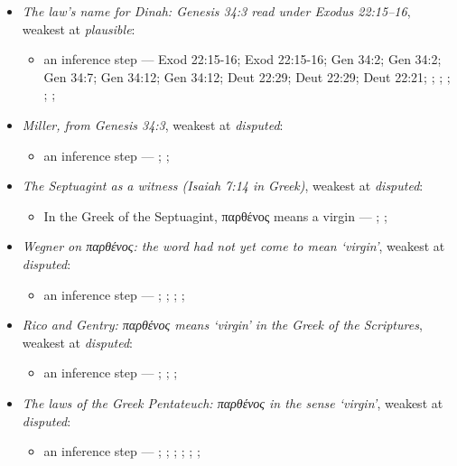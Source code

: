 \documentclass[11pt]{article}
\begin{document}
\begin{itemize}
\item \emph{The law’s name for Dinah: Genesis 34:3 read under Exodus 22:15–16}, weakest at \emph{plausible}:
\begin{itemize}
\item an inference step --- Exod 22:15-16; Exod 22:15-16; Gen 34:2; Gen 34:2; Gen 34:7; Gen 34:12; Gen 34:12; Deut 22:29; Deut 22:29; Deut 22:21; \cite[80, 91]{frymer-kensky-virginity-1998}; \cite[405--426]{enc-referential-analysis-1986}; \cite[18--21]{rico-gentry-infant-king-2020}; \cite[113]{bratcher-study-of-isaiah-1958}; \cite[483]{wegner-virgin-births-2011}; \cite[67]{rhodea-did-matthew-conceive-2013}
\end{itemize}
\item \emph{Miller, from Genesis 34:3}, weakest at \emph{disputed}:
\begin{itemize}
\item an inference step --- \cite{miller-born-divine-2003}; \cite[18--21]{rico-gentry-infant-king-2020}; \cite[113]{bratcher-study-of-isaiah-1958}
\end{itemize}
\item \emph{The Septuagint as a witness (Isaiah 7:14 in Greek)}, weakest at \emph{disputed}:
\begin{itemize}
\item In the Greek of the Septuagint, παρθένος means a virgin --- \cite[21]{rico-gentry-infant-king-2020}; \cite[113]{bratcher-study-of-isaiah-1958}; \cite[472]{postell-isaiah-messianic-2025}
\end{itemize}
\item \emph{Wegner on παρθένος: the word had not yet come to mean ‘virgin’}, weakest at \emph{disputed}:
\begin{itemize}
\item an inference step --- \cite[482--483]{wegner-virgin-births-2011}; \cite[67]{rhodea-did-matthew-conceive-2013}; \cite{meade-ancient-versions-comment-2013}; \cite[18--21]{rico-gentry-infant-king-2020}; \cite[112--113]{bratcher-study-of-isaiah-1958}
\end{itemize}
\item \emph{Rico and Gentry: παρθένος means ‘virgin’ in the Greek of the Scriptures}, weakest at \emph{disputed}:
\begin{itemize}
\item an inference step --- \cite[21]{rico-gentry-infant-king-2020}; \cite[472]{postell-isaiah-messianic-2025}; \cite[456]{davidson-immanuel-1899}; \cite{meade-ancient-versions-comment-2013}
\end{itemize}
\item \emph{The laws of the Greek Pentateuch: παρθένος in the sense ‘virgin’}, weakest at \emph{disputed}:
\begin{itemize}
\item an inference step --- \cite[113]{bratcher-study-of-isaiah-1958}; \cite[102]{bratcher-study-of-isaiah-1958}; \cite[1339]{liddell-scott-jones-lexicon-1940}; \cite[535]{muraoka-lexicon-septuagint-2009}; \cite[s.v. παρθένια]{lust-lexicon-septuagint-2003}; \cite{miller-born-divine-2003}; \cite[67]{rhodea-did-matthew-conceive-2013}
\end{itemize}
\end{itemize}
\end{document}
